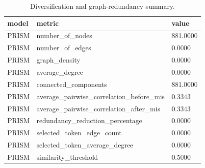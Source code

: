 \begin{table}[htbp]
\centering
\begin{tabular}{lll}
\hline
model & metric & value \\
\hline
PRISM & number_of_nodes & 881.0000 \\
PRISM & number_of_edges & 0.0000 \\
PRISM & graph_density & 0.0000 \\
PRISM & average_degree & 0.0000 \\
PRISM & connected_components & 881.0000 \\
PRISM & average_pairwise_correlation_before_mis & 0.3343 \\
PRISM & average_pairwise_correlation_after_mis & 0.3343 \\
PRISM & redundancy_reduction_percentage & 0.0000 \\
PRISM & selected_token_edge_count & 0.0000 \\
PRISM & selected_token_average_degree & 0.0000 \\
PRISM & similarity_threshold & 0.5000 \\
\hline
\end{tabular}
\caption{Diversification and graph-redundancy summary.}
\label{table_diversification_metrics}
\end{table}